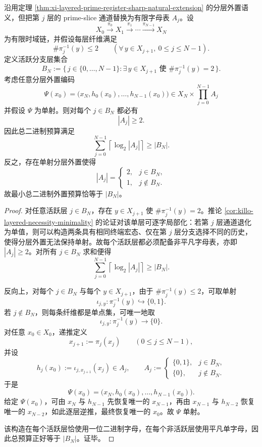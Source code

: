 \begin{theorem}[有限时域自然扩张的最小二进制外置预算]\label{thm:xi-finite-time-natural-extension-active-branch-budget}
沿用定理 \ref{thm:xi-layered-prime-register-sharp-natural-extension} 的分层外置语义，但把第 \(j\) 层的 prime-slice 通道替换为有限字母表 \(A_j\)。设
\[
X_0\xrightarrow{\pi_0}X_1\xrightarrow{\pi_1}\cdots\xrightarrow{\pi_{N-1}}X_N
\]
为有限时域链，并假设每层纤维满足
\[
\#\pi_j^{-1}(y)\le 2
\qquad
(\forall\,y\in X_{j+1},\ 0\le j\le N-1).
\]
定义活跃分支层集合
\[
B_N:=\{\,j\in\{0,\dots,N-1\}:\exists\,y\in X_{j+1}\text{ 使 }\#\pi_j^{-1}(y)=2\,\}.
\]
考虑任意分层外置编码
\[
\Psi(x_0)=\bigl(x_N,h_0(x_0),\dots,h_{N-1}(x_0)\bigr)\in X_N\times\prod_{j=0}^{N-1}A_j
\]
并假设 \(\Psi\) 为单射。则对每个 \(j\in B_N\) 都必有
\[
|A_j|\ge 2.
\]
因此总二进制预算满足
\[
\sum_{j=0}^{N-1}\left\lceil \log_2|A_j|\right\rceil\ge |B_N|.
\]
反之，存在单射分层外置使得
\[
|A_j|=
\begin{cases}
2,& j\in B_N,\\
1,& j\notin B_N.
\end{cases}
\]
故最小总二进制外置预算恰等于 \(|B_N|\)。
\end{theorem}
\begin{proof}
对任意活跃层 \(j\in B_N\)，存在 \(y\in X_{j+1}\) 使 \(\#\pi_j^{-1}(y)=2\)。推论 \ref{cor:killo-layered-necessity-minimality} 的论证对该单层可逐字局部化：若第 \(j\) 层通道退化为单值，则可以构造两条具有相同终端宏态、仅在第 \(j\) 层分支选择不同的历史，使得分层外置无法保持单射。故每个活跃层都必须配备非平凡字母表，亦即 \(|A_j|\ge 2\)。对所有 \(j\in B_N\) 求和便得
\[
\sum_{j=0}^{N-1}\left\lceil \log_2|A_j|\right\rceil\ge |B_N|.
\]

反向上，对每个 \(j\in B_N\) 与每个 \(y\in X_{j+1}\)，由于 \(\#\pi_j^{-1}(y)\le 2\)，可取单射
\[
\iota_{j,y}:\pi_j^{-1}(y)\hookrightarrow \{0,1\}.
\]
若 \(j\notin B_N\)，则每条纤维都是单点集，可唯一地取
\[
\iota_{j,y}:\pi_j^{-1}(y)\to \{0\}.
\]
对任意 \(x_0\in X_0\)，递推定义
\[
x_{j+1}:=\pi_j(x_j)\qquad(0\le j\le N-1),
\]
并设
\[
h_j(x_0):=\iota_{j,x_{j+1}}(x_j)\in A_j,
\qquad
A_j:=
\begin{cases}
\{0,1\},& j\in B_N,\\
\{0\},& j\notin B_N.
\end{cases}
\]
于是
\[
\Psi(x_0)=\bigl(x_N,h_0(x_0),\dots,h_{N-1}(x_0)\bigr).
\]
给定 \(\Psi(x_0)\)，可由 \(x_N\) 与 \(h_{N-1}\) 先恢复唯一的 \(x_{N-1}\)，再由 \(x_{N-1}\) 与 \(h_{N-2}\) 恢复唯一的 \(x_{N-2}\)，如此逐层逆推，最终恢复唯一的 \(x_0\)。故 \(\Psi\) 单射。

该构造在每个活跃层恰使用一位二进制字母，在每个非活跃层使用平凡单字母，因此总预算正好等于 \(|B_N|\)。证毕。
\end{proof}

